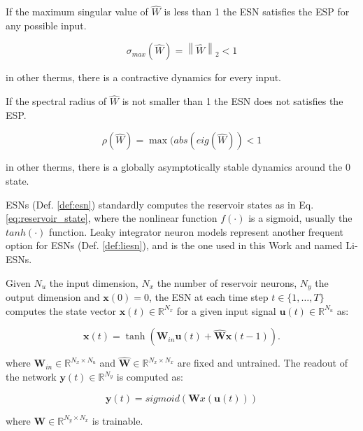 \begin{theorem}\label{thm:suff_cond_esp}
If the maximum singular value of $\widehat{W}$ is less than 1 the ESN satisfies the ESP for any possible input.

\begin{equation}
    \sigma_{max}(\widehat{W})=\left\| \widehat{W} \right\|_2 < 1
\end{equation}

in other therms, there is a contractive dynamics for every input. \\
\end{theorem}


\begin{theorem}\label{thm:nec_cond_esp}
If the spectral radius of $\widehat{W}$ is not smaller than 1 the ESN does not satisfies the ESP.

\begin{equation}
    \rho(\widehat{W})=\max(abs(eig(\widehat{W})) < 1
\end{equation}

in other therms, there is a globally asymptotically stable dynamics around the 0 state. \\
\end{theorem}


ESNs (Def. \ref{def:esn}) standardly computes the reservoir states as in Eq. \ref{eq:reservoir_state}, where the nonlinear function $f(\cdot)$ is a sigmoid, usually the $tanh(\cdot)$ function. Leaky integrator neuron models represent another frequent option for ESNs (Def. \ref{def:liesn}), and is the one used in this Work and named Li-ESNs. \\

\begin{definition}[ESN]\label{def:esn}
Given $N_u$ the input dimension, $N_x$ the number of reservoir neurons, $N_y$ the output dimension and $\textbf{x}(0)=0$, the ESN at each time step $t \in \{1,\dots, T\}$ computes the state vector $\textbf{x}(t) \in \mathbb{R}^{N_x}$ for a given input signal $\textbf{u}(t) \in \mathbb{R}^{N_u}$ as:

\begin{equation}\nonumber
    \textbf{x}(t)=\tanh(\textbf{W}_{in}\textbf{u}(t)+\widehat{\textbf{W}}\textbf{x}(t-1)).
\end{equation}

where $\textbf{W}_{in} \in \mathbb{R}^{N_x \times N_u}$ and $\widehat{\textbf{W}} \in \mathbb{R}^{N_x \times N_x}$ are fixed and untrained. The readout of the network $\textbf{y}(t) \in \mathbb{R}^{N_y}$ is computed as:

\begin{equation}\nonumber
    \textbf{y}(t)=sigmoid(\textbf{W}x(\textbf{u}(t)))
\end{equation}

where $\textbf{W} \in \mathbb{R}^{N_y \times N_x}$ is trainable. \\\\
\end{definition}



